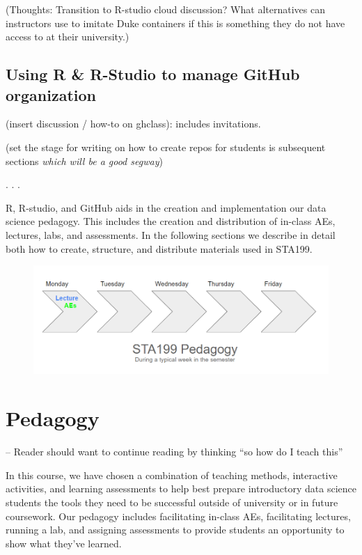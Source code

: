 \documentclass[
  12pt]{article}
\begin{document}
(Thoughts: Transition to R-studio cloud discussion? What alternatives
can instructors use to imitate Duke containers if this is something they
do not have access to at their university.)

\hypertarget{using-r-r-studio-to-manage-github-organization}{%
\subsection{Using R \& R-Studio to manage GitHub
organization}\label{using-r-r-studio-to-manage-github-organization}}

(insert discussion / how-to on ghclass): includes invitations.

(set the stage for writing on how to create repos for students is
subsequent sections \emph{which will be a good segway})

. . .

R, R-studio, and GitHub aids in the creation and implementation our data
science pedagogy. This includes the creation and distribution of
in-class AEs, lectures, labs, and assessments. In the following sections
we describe in detail both how to create, structure, and distribute
materials used in STA199.

\begin{figure}

{\centering \includegraphics{images/pedagogy.png}

}

\end{figure}

\hypertarget{sec-ped}{%
\section{Pedagogy}\label{sec-ped}}

-- Reader should want to continue reading by thinking ``so how do I
teach this''

In this course, we have chosen a combination of teaching methods,
interactive activities, and learning assessments to help best prepare
introductory data science students the tools they need to be successful
outside of university or in future coursework. Our pedagogy includes
facilitating in-class AEs, facilitating lectures, running a lab, and
assigning assessments to provide students an opportunity to show what
they've learned.
\end{document}
